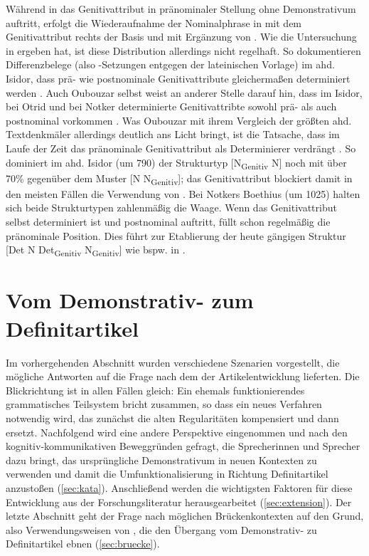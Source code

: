 \noindent
Während in  das Genitivattribut  in pränominaler Stellung ohne Demonstrativum auftritt, erfolgt die Wiederaufnahme der Nominalphrase in  mit dem Genitivattribut rechts der Basis und mit Ergänzung von . Wie die Untersuchung in \textcite{Szczepaniak2015} ergeben hat, ist diese Distribution allerdings nicht regelhaft. So dokumentieren Differenzbelege (also -Setzungen entgegen der lateinischen Vorlage) im ahd. Isidor, dass prä- wie postnominale Genitivattribute gleichermaßen determiniert werden \parencite[199]{Szczepaniak2015}. Auch Oubouzar selbst weist an anderer Stelle  darauf hin, dass im Isidor, bei Otrid und bei Notker determinierte Genitivattribte sowohl prä- als auch postnominal vorkommen \parencite[234]{Oubouzar1997}. Was Oubouzar mit ihrem Vergleich der größten ahd. Textdenkmäler allerdings deutlich ans Licht bringt, ist die Tatsache, dass  im Laufe der Zeit das pränominale Genitivattribut als Determinierer verdrängt \parencite[236ff.]{Oubouzar1997}. So dominiert im ahd. Isidor (um 790) der Strukturtyp [N\textsubscript{Genitiv} N] noch mit über 70\%  gegenüber dem Muster [N N\textsubscript{Genitiv}]; das Genitivattribut blockiert damit in den meisten Fällen die Verwendung von . Bei Notkers Boethius (um 1025) halten sich beide Strukturtypen zahlenmäßig die Waage. Wenn das Genitivattribut selbst determiniert ist und postnominal auftritt, füllt  schon regelmäßig die pränominale Position. Dies führt zur Etablierung der heute gängigen Struktur [Det N Det\textsubscript{Genitiv} N\textsubscript{Genitiv}] wie bspw. in  \parencite[241]{Oubouzar1997}. 

\section{Vom Demonstrativ- zum Definitartikel} \label{sec:demzudef}

Im vorhergehenden Abschnitt wurden verschiedene Szenarien vorgestellt, die mögliche Antworten auf die Frage nach dem  der Artikelentwicklung lieferten. Die Blickrichtung ist in allen Fällen gleich: Ein ehemals funktionierendes grammatisches Teilsystem bricht zusammen, so dass ein neues Verfahren notwendig wird, das zunächst die alten Regularitäten kompensiert und dann ersetzt. Nachfolgend wird eine andere Perspektive eingenommen und nach den kognitiv-kommunikativen Beweggründen gefragt, die Sprecherinnen und Sprecher dazu bringt, das ursprüngliche Demonstrativum in neuen Kontexten zu verwenden und damit die Umfunktionalisierung in Richtung Definitartikel anzustoßen  (\ref{sec:kata}). Anschließend werden die wichtigsten Faktoren für diese Entwicklung aus der Forschungsliteratur herausgearbeitet (\ref{sec:extension}). Der letzte Abschnitt geht der Frage nach möglichen Brückenkontexten auf den Grund, also Verwendungsweisen von , die den Übergang vom Demonstrativ- zu Definitartikel ebnen (\ref{sec:bruecke}).  

